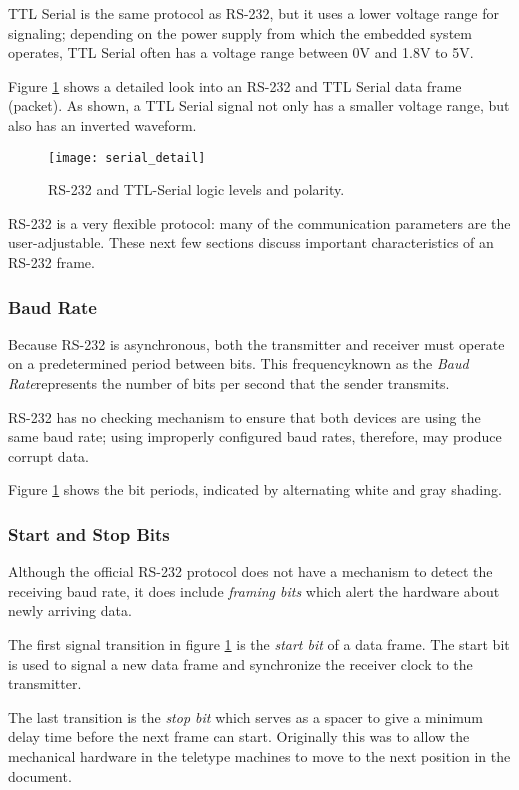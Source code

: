 \documentclass[openany,11pt,fleqn]{book} %
\begin{document}
TTL Serial is the same protocol as RS-232, but it uses a lower voltage range for signaling; depending on the power supply from which the embedded system operates, TTL Serial often has a voltage range between 0V and 1.8V to 5V. 

Figure \ref{serial_detail} shows a detailed look into an RS-232 and TTL Serial data frame (packet). As shown, a TTL Serial signal not only has a smaller voltage range, but also has an inverted waveform. 

\begin{figure}[]
    \centering\texttt{[image: serial\_detail]}
    \caption{RS-232 and TTL-Serial logic levels and polarity.}
    \label{serial_detail}
\end{figure}

RS-232 is a very flexible protocol: many of the communication parameters are the user-adjustable. These next few sections discuss important characteristics of an RS-232 frame.  

\subsubsection{Baud Rate} 
Because RS-232 is asynchronous, both the transmitter and receiver must operate on a predetermined period between bits. This frequency\textemdash known as the \textit{Baud Rate}\textemdash represents the number of bits per second that the sender transmits. 

RS-232 has no checking mechanism to ensure that both devices are using the same baud rate; using improperly configured baud rates, therefore, may produce corrupt data. 

Figure \ref{serial_detail} shows the bit periods, indicated by alternating white and gray shading. 

\subsubsection{Start and Stop Bits}
Although the official RS-232 protocol does not have a mechanism to detect the receiving baud rate, it does include \textit{framing bits} which alert the hardware about newly arriving data. 

The first signal transition in figure \ref{serial_detail} is the \textit{start bit} of a data frame. The start bit is used to signal a new data frame and synchronize the receiver clock to the transmitter.   

The last transition is the \textit{stop bit} which serves as a spacer to give a minimum delay time before the next frame can start. Originally this was to allow the mechanical hardware in the teletype machines to move to the next position in the document.
\end{document}
